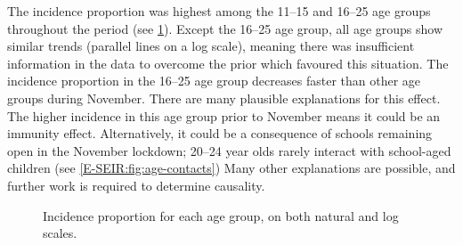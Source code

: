 \documentclass[thesis.tex]{subfiles}
\begin{document}
The incidence proportion was highest among the 11--15 and 16--25 age groups throughout the period (see \cref{transmission:fig:backcalc-ages}).
Except the 16--25 age group, all age groups show similar trends (\ie parallel lines on a log scale), meaning there was insufficient information in the data to overcome the prior which favoured this situation.
The incidence proportion in the 16--25 age group decreases faster than other age groups during November.
There are many plausible explanations for this effect.
The higher incidence in this age group prior to November means it could be an immunity effect.
Alternatively, it could be a consequence of schools remaining open in the November lockdown; 20--24 year olds rarely interact with school-aged children (see \cref{E-SEIR:fig:age-contacts})
Many other explanations are possible, and further work is required to determine causality.
\begin{figure}
    \caption[Incidence estimated using backcalculation by age group]{%
        Incidence proportion for each age group, on both natural and log scales.
    }
    \label{transmission:fig:backcalc-ages}
\end{figure}
\end{document}
